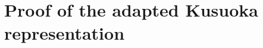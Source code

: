 \documentclass[a4paper]{amsart}
\theoremstyle{definition}
\newcommand{\E}{\mathbb{E}}
\newcommand{\F}{\mathcal{F}}
\newcommand{\id}{\textup{id}}
\newcommand{\law}{\mathcal{L}}
\renewcommand{\P}{\mathbb{P}}
\begin{document}








\section{Proof of the adapted Kusuoka representation}
\label{sec:adapted-kusuoka}
\end{document}
